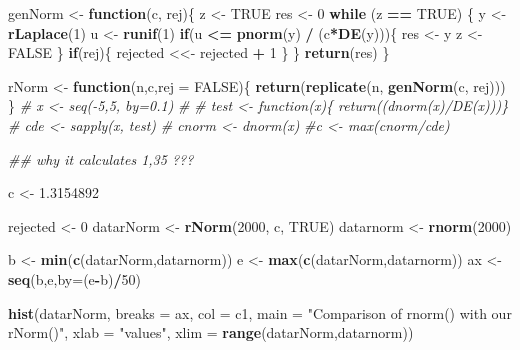 \documentclass[
]{article}
\newenvironment{Shaded}{\begin{snugshade}}{\end{snugshade}}
\newcommand{\CommentTok}[1]{\textcolor[rgb]{0.56,0.35,0.01}{\textit{#1}}}
\newcommand{\ControlFlowTok}[1]{\textcolor[rgb]{0.13,0.29,0.53}{\textbf{#1}}}
\newcommand{\DataTypeTok}[1]{\textcolor[rgb]{0.13,0.29,0.53}{#1}}
\newcommand{\DecValTok}[1]{\textcolor[rgb]{0.00,0.00,0.81}{#1}}
\newcommand{\FloatTok}[1]{\textcolor[rgb]{0.00,0.00,0.81}{#1}}
\newcommand{\KeywordTok}[1]{\textcolor[rgb]{0.13,0.29,0.53}{\textbf{#1}}}
\newcommand{\NormalTok}[1]{#1}
\newcommand{\OperatorTok}[1]{\textcolor[rgb]{0.81,0.36,0.00}{\textbf{#1}}}
\newcommand{\OtherTok}[1]{\textcolor[rgb]{0.56,0.35,0.01}{#1}}
\newcommand{\StringTok}[1]{\textcolor[rgb]{0.31,0.60,0.02}{#1}}
\begin{document}
\begin{Shaded}
\begin{Highlighting}[]
\NormalTok{genNorm <-}\StringTok{ }\ControlFlowTok{function}\NormalTok{(c, rej)\{}
\NormalTok{  z <-}\StringTok{ }\OtherTok{TRUE}
\NormalTok{  res <-}\StringTok{ }\DecValTok{0}
  \ControlFlowTok{while}\NormalTok{ (z }\OperatorTok{==}\StringTok{ }\OtherTok{TRUE}\NormalTok{) \{}
\NormalTok{    y <-}\StringTok{ }\KeywordTok{rLaplace}\NormalTok{(}\DecValTok{1}\NormalTok{)}
\NormalTok{    u <-}\StringTok{ }\KeywordTok{runif}\NormalTok{(}\DecValTok{1}\NormalTok{)}
    \ControlFlowTok{if}\NormalTok{(u }\OperatorTok{<=}\StringTok{ }\KeywordTok{pnorm}\NormalTok{(y) }\OperatorTok{/}\StringTok{ }\NormalTok{(c}\OperatorTok{*}\KeywordTok{DE}\NormalTok{(y)))\{}
\NormalTok{      res <-}\StringTok{ }\NormalTok{y}
\NormalTok{      z <-}\StringTok{ }\OtherTok{FALSE}    
\NormalTok{    \}}
    \ControlFlowTok{if}\NormalTok{(rej)\{}
\NormalTok{    rejected <<-}\StringTok{ }\NormalTok{rejected }\OperatorTok{+}\StringTok{ }\DecValTok{1}
\NormalTok{    \}}
\NormalTok{  \}}
  \KeywordTok{return}\NormalTok{(res)}
\NormalTok{\}}
  
\NormalTok{rNorm <-}\StringTok{ }\ControlFlowTok{function}\NormalTok{(n,c,}\DataTypeTok{rej =} \OtherTok{FALSE}\NormalTok{)\{}
 \KeywordTok{return}\NormalTok{(}\KeywordTok{replicate}\NormalTok{(n, }\KeywordTok{genNorm}\NormalTok{(c, rej)))}
\NormalTok{\}}
\CommentTok{# x <- seq(-5,5, by=0.1)}
\CommentTok{# }
\CommentTok{# test <- function(x)\{ return((dnorm(x)/DE(x)))\}}
\CommentTok{# cde <- sapply(x, test)}
\CommentTok{# cnorm <- dnorm(x)}
\CommentTok{#c <- max(cnorm/cde)}

\CommentTok{## why it calculates 1,35 ???}

\NormalTok{c <-}\StringTok{ }\FloatTok{1.3154892}

\NormalTok{rejected <-}\StringTok{ }\DecValTok{0}
\NormalTok{datarNorm <-}\StringTok{ }\KeywordTok{rNorm}\NormalTok{(}\DecValTok{2000}\NormalTok{, c, }\OtherTok{TRUE}\NormalTok{)}
\NormalTok{datarnorm <-}\StringTok{ }\KeywordTok{rnorm}\NormalTok{(}\DecValTok{2000}\NormalTok{)}

\NormalTok{b <-}\StringTok{ }\KeywordTok{min}\NormalTok{(}\KeywordTok{c}\NormalTok{(datarNorm,datarnorm))}
\NormalTok{e <-}\StringTok{ }\KeywordTok{max}\NormalTok{(}\KeywordTok{c}\NormalTok{(datarNorm,datarnorm))}
\NormalTok{ax <-}\StringTok{ }\KeywordTok{seq}\NormalTok{(b,e,}\DataTypeTok{by=}\NormalTok{(e}\OperatorTok{-}\NormalTok{b)}\OperatorTok{/}\DecValTok{50}\NormalTok{)}



\KeywordTok{hist}\NormalTok{(datarNorm, }\DataTypeTok{breaks =}\NormalTok{ ax,}
     \DataTypeTok{col =}\NormalTok{ c1,}
     \DataTypeTok{main =} \StringTok{"Comparison of rnorm()  with our rNorm()"}\NormalTok{,}
     \DataTypeTok{xlab =} \StringTok{"values"}\NormalTok{,}
     \DataTypeTok{xlim =} \KeywordTok{range}\NormalTok{(datarNorm,datarnorm))}


\end{Highlighting}
\end{Shaded}
\end{document}

